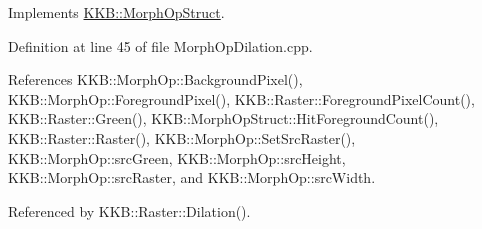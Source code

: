 Implements \hyperlink{class_k_k_b_1_1_morph_op_struct_ace5b649ea317fcc38094e64bb5034380}{K\+K\+B\+::\+Morph\+Op\+Struct}.



Definition at line 45 of file Morph\+Op\+Dilation.\+cpp.



References K\+K\+B\+::\+Morph\+Op\+::\+Background\+Pixel(), K\+K\+B\+::\+Morph\+Op\+::\+Foreground\+Pixel(), K\+K\+B\+::\+Raster\+::\+Foreground\+Pixel\+Count(), K\+K\+B\+::\+Raster\+::\+Green(), K\+K\+B\+::\+Morph\+Op\+Struct\+::\+Hit\+Foreground\+Count(), K\+K\+B\+::\+Raster\+::\+Raster(), K\+K\+B\+::\+Morph\+Op\+::\+Set\+Src\+Raster(), K\+K\+B\+::\+Morph\+Op\+::src\+Green, K\+K\+B\+::\+Morph\+Op\+::src\+Height, K\+K\+B\+::\+Morph\+Op\+::src\+Raster, and K\+K\+B\+::\+Morph\+Op\+::src\+Width.



Referenced by K\+K\+B\+::\+Raster\+::\+Dilation().


